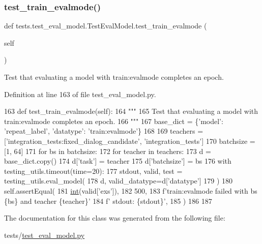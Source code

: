 \subsubsection{\texorpdfstring{test\+\_\+train\+\_\+evalmode()}{test\_train\_evalmode()}}
{\footnotesize\ttfamily def tests.\+test\+\_\+eval\+\_\+model.\+Test\+Eval\+Model.\+test\+\_\+train\+\_\+evalmode (\begin{DoxyParamCaption}\item[{}]{self }\end{DoxyParamCaption})}

\begin{DoxyVerb}Test that evaluating a model with train:evalmode completes an epoch.
\end{DoxyVerb}
 

Definition at line 163 of file test\+\_\+eval\+\_\+model.\+py.


\begin{DoxyCode}
163     \textcolor{keyword}{def }test\_train\_evalmode(self):
164         \textcolor{stringliteral}{"""}
165 \textcolor{stringliteral}{        Test that evaluating a model with train:evalmode completes an epoch.}
166 \textcolor{stringliteral}{        """}
167         base\_dict = \{\textcolor{stringliteral}{'model'}: \textcolor{stringliteral}{'repeat\_label'}, \textcolor{stringliteral}{'datatype'}: \textcolor{stringliteral}{'train:evalmode'}\}
168 
169         teachers = [\textcolor{stringliteral}{'integration\_tests:fixed\_dialog\_candidate'}, \textcolor{stringliteral}{'integration\_tests'}]
170         batchsize = [1, 64]
171         \textcolor{keywordflow}{for} bs \textcolor{keywordflow}{in} batchsize:
172             \textcolor{keywordflow}{for} teacher \textcolor{keywordflow}{in} teachers:
173                 d = base\_dict.copy()
174                 d[\textcolor{stringliteral}{'task'}] = teacher
175                 d[\textcolor{stringliteral}{'batchsize'}] = bs
176                 with testing\_utils.timeout(time=20):
177                     stdout, valid, test = testing\_utils.eval\_model(
178                         d, valid\_datatype=d[\textcolor{stringliteral}{'datatype'}]
179                     )
180                 self.assertEqual(
181                     \hyperlink{namespacelanguage__model_1_1eval__ppl_a7d12ee00479673c5c8d1f6d01faa272a}{int}(valid[\textcolor{stringliteral}{'exs'}]),
182                     500,
183                     f\textcolor{stringliteral}{'train:evalmode failed with bs \{bs\} and teacher \{teacher\}'}
184                     f\textcolor{stringliteral}{' stdout: \{stdout\}'},
185                 )
186 
187 
\end{DoxyCode}


The documentation for this class was generated from the following file\+:\begin{DoxyCompactItemize}
\item 
tests/\hyperlink{test__eval__model_8py}{test\+\_\+eval\+\_\+model.\+py}\end{DoxyCompactItemize}
